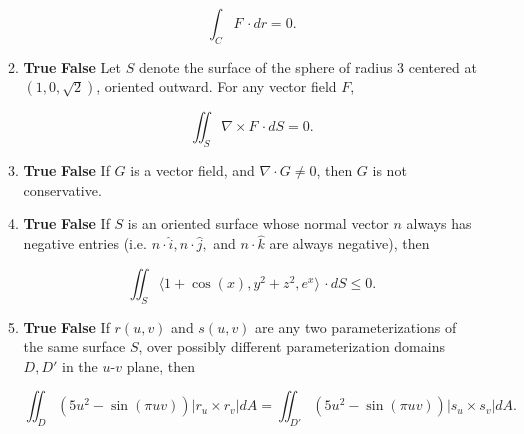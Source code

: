 \documentclass[12 pt]{report}
\begin{document}
\begin{enumerate}
\begin{enumerate}
\[
\int_C F \, \cdot dr = 0.
\]

\vfill

\item \textbf{True} \hspace{5pt} \textbf{False} \hspace{5pt} Let $S$ denote the surface of the sphere of radius $3$ centered at $(1,0, \sqrt{2})$, oriented outward. For any vector field $F$, 

\[ 
\iint_S \nabla \times F \, \cdot dS = 0.
\]

\vfill

\item \textbf{True} \hspace{5pt} \textbf{False} \hspace{5pt} If $G$ is a vector field, and $\nabla \cdot G \neq 0$, then $G$ is not conservative. 

\vfill

\item \textbf{True} \hspace{5pt} \textbf{False} \hspace{5pt} If $S$ is an oriented surface whose normal vector $n$ always has negative entries (i.e. $n \cdot \hat{i}, n \cdot \hat{j},$ and $n \cdot \hat{k}$ are always negative), then

\[
\iint_S \langle 1+\cos(x), y^2 + z^2, e^x  \rangle \, \cdot dS \leq 0.
\]

\vfill

\item \textbf{True} \hspace{5pt} \textbf{False} \hspace{5pt} If $r(u,v)$ and $s(u,v)$ are any two parameterizations of the same surface $S$, over possibly different parameterization domains $D, D'$ in the $u$-$v$ plane, then 

\[ 
\iint_D (5u^2 - \sin(\pi u v)) |r_u \times r_v| dA = \iint_{D'} (5u^2 - \sin(\pi u v)) |s_u \times s_v| dA.
\]

\vfill


\end{enumerate}

%
%


\end{enumerate}
\end{document}
